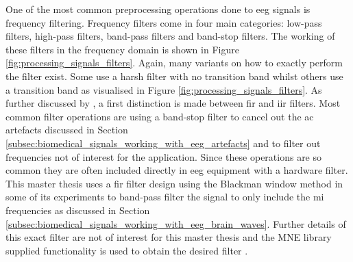 One of the most common preprocessing operations done to \gls{eeg} signals is frequency filtering.
Frequency filters come in four main categories: low-pass filters, high-pass filters, band-pass filters and band-stop filters.
The working of these filters in the frequency domain is shown in Figure \ref{fig:processing_signals_filters}.
Again, many variants on how to exactly perform the filter exist.
Some use a harsh filter with no transition band whilst others use a transition band as visualised in Figure \ref{fig:processing_signals_filters}.
As further discussed by \citet{fir_iir_filter}, a first distinction is made between \gls{fir} and \gls{iir} filters.
Most common filter operations are using a band-stop filter to cancel out the \gls{ac} artefacts discussed in Section \ref{subsec:biomedical_signals_working_with_eeg_artefacts} and to filter out frequencies not of interest for the application.
Since these operations are so common they are often included directly in \gls{eeg} equipment with a hardware filter.
This master thesis uses a \gls{fir} filter design using the Blackman window method in some of its experiments to band-pass filter the signal to only include the \gls{mi} frequencies as discussed in Section \ref{subsec:biomedical_signals_working_with_eeg_brain_waves}.
Further details of this exact filter are not of interest for this master thesis and the MNE library supplied functionality is used to obtain the desired filter \citep{mne}.


